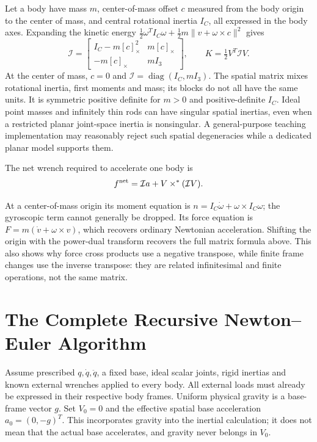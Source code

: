 Let a body have mass $m$, center-of-mass offset $c$ measured from the body origin to the center of mass, and central rotational inertia $I_C$, all expressed in the body axes. Expanding the kinetic energy $\tfrac12\omega^TI_C\omega+\tfrac12m\|v+\omega\times c\|^2$ gives
\begin{equation}
 \mathcal I=
 \begin{bmatrix}
 I_C-m[c]_\times^2&m[c]_\times\\
 -m[c]_\times&mI_3
 \end{bmatrix},\qquad K=\tfrac12 V^T\mathcal I V.
 \label{eq:spatial_inertia_parallel_axis}
\end{equation}
\label{eq:spatial_inertia_simple}
At the center of mass, $c=0$ and $\mathcal I=\operatorname{diag}(I_C,mI_3)$. The spatial matrix mixes rotational inertia, first moments and mass; its blocks do not all have the same units. It is symmetric positive definite for $m>0$ and positive-definite $I_C$. Ideal point masses and infinitely thin rods can have singular spatial inertias, even when a restricted planar joint-space inertia is nonsingular. A general-purpose teaching implementation may reasonably reject such spatial degeneracies while a dedicated planar model supports them.

The net wrench required to accelerate one body is
\begin{equation}
 f^{\rm net}=\mathcal I a+V\times^*(\mathcal I V).
 \label{eq:spatial_newton_euler}
\end{equation}

At a center-of-mass origin its moment equation is $n=I_C\dot\omega+\omega\times I_C\omega$; the gyroscopic term cannot generally be dropped. Its force equation is $F=m(\dot v+\omega\times v)$, which recovers ordinary Newtonian acceleration. Shifting the origin with the power-dual transform recovers the full matrix formula above. This also shows why force cross products use a negative transpose, while finite frame changes use the inverse transpose: they are related infinitesimal and finite operations, not the same matrix.

\section{The Complete Recursive Newton--Euler Algorithm}
\label{sec:rnea}

Assume prescribed $q,\dot q,\ddot q$, a fixed base, ideal scalar joints, rigid inertias and known external wrenches applied to every body. All external loads must already be expressed in their respective body frames. Uniform physical gravity is a base-frame vector $g$. Set $V_0=0$ and the effective spatial base acceleration $a_0=(0,-g)^T$. This incorporates gravity into the inertial calculation; it does not mean that the actual base accelerates, and gravity never belongs in $V_0$.

